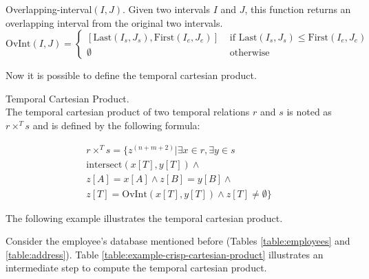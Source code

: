 \documentclass{llncs}
\begin{document}
\begin{definition}
 \label{def:crisp-overlapping-interval}
Overlapping-interval$\left(I, J \right)$. Given two intervals $I$ and $J$, this function returns an overlapping interval from the original two intervals.
\begin{equation}
 \label{eq:crisp-overlapping-interval}
\mbox{OvInt}\left(I, J \right) = 
\begin{cases}
\left[\mbox{Last}\left( I_s, J_s \right), \mbox{First}\left(I_e, J_e \right) \right] & \mbox{ if } \mbox{Last}\left( I_s, J_s \right) \leq \mbox{First}\left(I_e, J_e \right) \\
\emptyset & \mbox{ otherwise } 
\end{cases}
\end{equation}
\end{definition}

Now it is possible to define the temporal cartesian product.

\begin{definition}
 \label{def:crisp-temporal-cartesian-product}
Temporal Cartesian Product.\\
The temporal cartesian product of two temporal relations $r$ and $s$ is noted as $r \times^T s$ and is defined by the following formula:

\begin{align}
 \label{eq:crisp-temporal-cartesian-product}
r \times^T s =  \lbrace z^{\left(n+m+2 \right)} | \exists x \in r, \exists y \in s \\
\nonumber
\mbox{intersect}\left(x[T], y[T] \right) \wedge \\
\nonumber
z\left[A\right] = x\left[A\right] \wedge z\left[B\right] = y \left[B \right] \wedge \\
\nonumber
 z\left[T \right] = \mbox{OvInt}\left(x\left[T\right], y\left[T\right] \right) \wedge z\left[T\right] \neq \emptyset  \rbrace
\end{align}

\end{definition}

The following example illustrates the temporal cartesian product.
\begin{example}
 \label{ex:crisp-temporal-cartesian-product}
Consider the employee's database mentioned before (Tables \ref{table:employees} and \ref{table:address}). Table \ref{table:example-crisp-cartesian-product} illustrates an intermediate step to compute the temporal cartesian  product.



\end{example}
\end{document}
